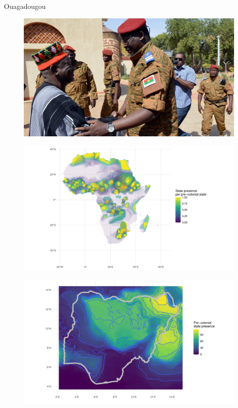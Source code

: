 \documentclass{beamer}
\begin{document}
\begin{frame} Ouagadougou
	\begin{figure}
		\includegraphics[width=\linewidth]{img/moghonaba.jpg}
	\end{figure}
\end{frame}

\begin{frame} %
	\begin{figure}
		\includegraphics[width=\linewidth]{img/geo_isd_all.pdf}
	\end{figure}
\end{frame}

\begin{frame} %
	\begin{figure}
		\includegraphics[width=\linewidth]{../R/Output/nigeria.pdf}
	\end{figure}
\end{frame}
\end{document}
